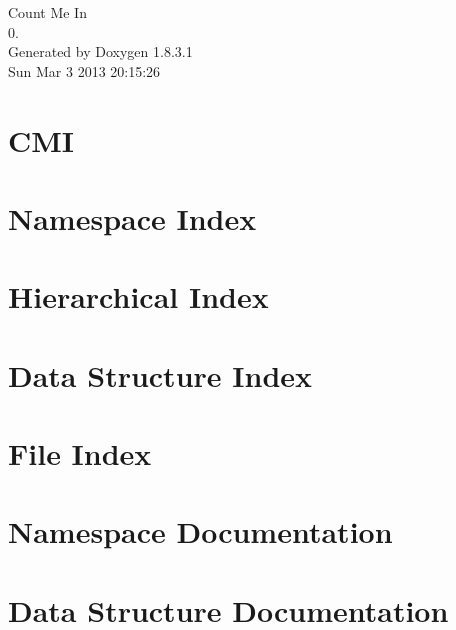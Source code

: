 \documentclass{book}
\begin{document}
\hypersetup{pageanchor=false,citecolor=blue}
\begin{titlepage}
\vspace*{7cm}
\begin{center}
{\Large Count Me In \\[1ex]\large 0. }\\
\vspace*{1cm}
{\large Generated by Doxygen 1.8.3.1}\\
\vspace*{0.5cm}
{\small Sun Mar 3 2013 20:15:26}\\
\end{center}
\end{titlepage}
\clearemptydoublepage
{}
\tableofcontents
\clearemptydoublepage
{}
\hypersetup{pageanchor=true,citecolor=blue}
\chapter{C\-M\-I}
\label{md_README}
\hypertarget{md_README}{}

\chapter{Namespace Index}

\chapter{Hierarchical Index}

\chapter{Data Structure Index}

\chapter{File Index}

\chapter{Namespace Documentation}



\chapter{Data Structure Documentation}


















\end{document}
